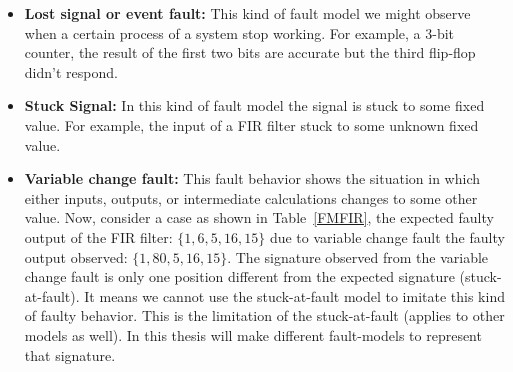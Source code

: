 \begin{itemize}
\item \textbf{Lost signal or event fault:} This kind of fault model we might observe when a certain process of a system stop working. For example, a 3-bit counter, the result of the first two bits are accurate but the third flip-flop didn't respond.

\item \textbf{Stuck Signal:} In this kind of fault model the signal is stuck to some fixed value. For example, the input of a FIR filter stuck to some unknown fixed value. 
 
\item \textbf{Variable change fault:} This fault behavior shows the situation in which either inputs, outputs, or intermediate calculations changes to some other value. Now, consider a case as shown in Table~\ref{FMFIR}, the expected faulty output of the FIR filter: $\{1, 6, 5, 16, 15\}$ due to variable change fault the faulty output observed: $\{1, 80, 5, 16, 15\}$. The signature observed from the variable change fault is only one position different from the expected signature (stuck-at-fault).  It means we cannot use the stuck-at-fault model to imitate this kind of faulty behavior. This is  the limitation of the stuck-at-fault (applies to other models as well). In this thesis will make different fault-models to represent that signature.
\begin{table}[tb!]
\center
\caption{Variable Change Fault Models FIR}
\label{FMFIR}
\end{table}
\end{itemize}
